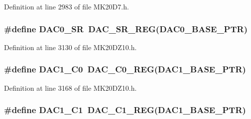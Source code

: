 Definition at line 2983 of file M\+K20\+D7.\+h.

\subsubsection[{\texorpdfstring{D\+A\+C0\+\_\+\+SR}{DAC0_SR}}]{\setlength{\rightskip}{0pt plus 5cm}\#define D\+A\+C0\+\_\+\+SR~{\bf D\+A\+C\+\_\+\+S\+R\+\_\+\+R\+EG}({\bf D\+A\+C0\+\_\+\+B\+A\+S\+E\+\_\+\+P\+TR})}\hypertarget{group___d_a_c___register___accessor___macros_gaecdc3a290fad8782ff0072d4fb540212}{}\label{group___d_a_c___register___accessor___macros_gaecdc3a290fad8782ff0072d4fb540212}


Definition at line 3130 of file M\+K20\+D\+Z10.\+h.

\subsubsection[{\texorpdfstring{D\+A\+C1\+\_\+\+C0}{DAC1_C0}}]{\setlength{\rightskip}{0pt plus 5cm}\#define D\+A\+C1\+\_\+\+C0~{\bf D\+A\+C\+\_\+\+C0\+\_\+\+R\+EG}({\bf D\+A\+C1\+\_\+\+B\+A\+S\+E\+\_\+\+P\+TR})}\hypertarget{group___d_a_c___register___accessor___macros_gaebe0e2f07cb4dff014936fb0ac6ca85f}{}\label{group___d_a_c___register___accessor___macros_gaebe0e2f07cb4dff014936fb0ac6ca85f}


Definition at line 3168 of file M\+K20\+D\+Z10.\+h.

\subsubsection[{\texorpdfstring{D\+A\+C1\+\_\+\+C1}{DAC1_C1}}]{\setlength{\rightskip}{0pt plus 5cm}\#define D\+A\+C1\+\_\+\+C1~{\bf D\+A\+C\+\_\+\+C1\+\_\+\+R\+EG}({\bf D\+A\+C1\+\_\+\+B\+A\+S\+E\+\_\+\+P\+TR})}\hypertarget{group___d_a_c___register___accessor___macros_gac449846288fa0b4dfe464e587b5b4dc1}{}\label{group___d_a_c___register___accessor___macros_gac449846288fa0b4dfe464e587b5b4dc1}


